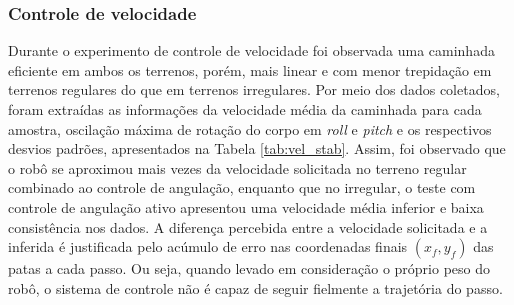\documentclass[../main.tex]{subfiles}
\begin{document}
  \subsubsection{Controle de velocidade}
  Durante o experimento de controle de velocidade foi observada uma caminhada eficiente em ambos os terrenos, porém, mais linear e com menor trepidação em terrenos regulares do que em terrenos irregulares. Por meio dos dados coletados, foram extraídas as informações da velocidade média da caminhada para cada amostra, oscilação máxima de rotação do corpo em \textit{roll} e \textit{pitch} e os respectivos desvios padrões, apresentados na Tabela \ref{tab:vel_stab}. Assim, foi observado que o robô se aproximou mais vezes da velocidade solicitada no terreno regular combinado ao controle de angulação, enquanto que no irregular, o teste com controle de angulação ativo apresentou uma velocidade média inferior e baixa consistência nos dados. A diferença percebida entre a velocidade solicitada e a inferida é justificada pelo acúmulo de erro nas coordenadas finais $(x_f, y_f)$ das patas a cada passo. Ou seja, quando levado em consideração o próprio peso do robô, o sistema de controle não é capaz de seguir fielmente a trajetória do passo.
\end{document}
